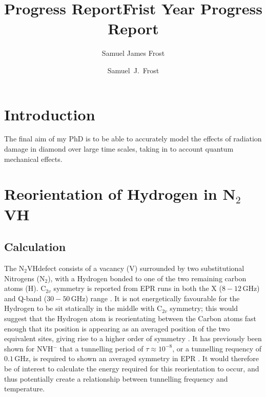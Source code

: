 \documentclass[10pt,a4paper,twocolumn,twoside]{extarticle}
\title{Progress Report}
\author{Samuel James Frost}
\title{Frist Year Progress Report}
\author{Samuel~J.~Frost}
\newcommand{\ntvh}{N$_2$VH}
\begin{document}
	\thispagestyle{empty}
	\tableofcontents

	
\section{Introduction}
The final aim of my PhD is to be able to accurately model the effects of radiation damage in diamond over large time scales, taking in to account quantum mechanical effects.

\section{Reorientation of Hydrogen in N$_2$VH}
\label{n2vh}
\subsection{Calculation}
\label{n2vh_calc}
The \ntvh defect consists of a vacancy (V) surrounded by two substitutional Nitrogens (N$_2$), with a Hydrogen bonded to one of the two remaining carbon atoms (H). C$_{2v}$ symmetry is reported from EPR runs in both the X ($8-12$\,GHz) and Q-band ($30-50$\,GHz) range \cite{Hartland}. It is not energetically favourable for the Hydrogen to be sit statically in the middle with C$_{2v}$ symmetry; this would suggest that the Hydrogen atom is reorientating between the Carbon atoms fast enough that its position is appearing as an averaged position of the two equivalent sites, giving rise to a higher order of symmetry \cite{Shaw_QT_VH}. 
It has previously been shown for NVH$^-$ that a tunnelling period of $\tau \approx 10^{-8}$, or a tunnelling requency of $0.1$\,GHz, is required to shown an averaged symmetry in EPR \cite{Edwards_N2VH_rate}. It would therefore be of interest to calculate the energy required for this reorientation to occur, and thus potentially create a relationship between tunnelling frequency and temperature. 
\end{document}
